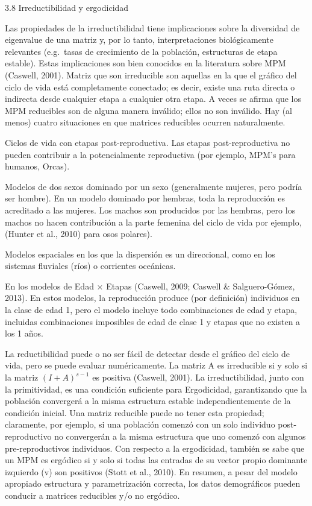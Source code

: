 \documentclass[
  12pt,
  letterpaper,
]{book}
\begin{document}
3.8 \textbar{} Irreductibilidad y ergodicidad

Las propiedades de la irreductibilidad tiene implicaciones sobre la
diversidad de eigenvalue de una matriz y, por lo tanto, interpretaciones
biológicamente relevantes (e.g.~tasas de crecimiento de la población,
estructuras de etapa estable). Estas implicaciones son bien conocidos en
la literatura sobre MPM (Caswell, 2001). Matriz que son irreducible son
aquellas en la que el gráfico del ciclo de vida está completamente
conectado; es decir, existe una ruta directa o indirecta desde cualquier
etapa a cualquier otra etapa. A veces se afirma que los MPM reducibles
son de alguna manera inválido; ellos no son inválido. Hay (al menos)
cuatro situaciones en que matrices reducibles ocurren naturalmente.

Ciclos de vida con etapas post-reproductiva. Las etapas
post-reproductiva no pueden contribuir a la potencialmente reproductiva
(por ejemplo, MPM's para humanos, Orcas).

Modelos de dos sexos dominado por un sexo (generalmente mujeres, pero
podría ser hombre). En un modelo dominado por hembras, toda la
reproducción es acreditado a las mujeres. Los machos son producidos por
las hembras, pero los machos no hacen contribución a la parte femenina
del ciclo de vida por ejemplo, (Hunter et al., 2010) para osos polares).

Modelos espaciales en los que la dispersión es un direccional, como en
los sistemas fluviales (ríos) o corrientes oceánicas.

En los modelos de Edad × Etapas (Caswell, 2009; Caswell \&
Salguero-Gómez, 2013). En estos modelos, la reproducción produce (por
definición) individuos en la clase de edad 1, pero el modelo incluye
todo combinaciones de edad y etapa, incluidas combinaciones imposibles
de edad de clase 1 y etapas que no existen a los 1 años.

La reductibilidad puede o no ser fácil de detectar desde el gráfico del
ciclo de vida, pero se puede evaluar numéricamente. La matriz A es
irreducible si y solo si la matriz \(\left(I+A\right)^{s-1}\) es
positiva (Caswell, 2001). La irreductibilidad, junto con la
primitividad, es una condición suficiente para Ergodicidad, garantizando
que la población convergerá a la misma estructura estable
independientemente de la condición inicial. Una matriz reducible puede
no tener esta propiedad; claramente, por ejemplo, si una población
comenzó con un solo individuo post-reproductivo no convergerán a la
misma estructura que uno comenzó con algunos pre-reproductivos
individuos. Con respecto a la ergodicidad, también se sabe que un MPM es
ergódico si y solo si todas las entradas de su vector propio dominante
izquierdo (v) son positivos (Stott et al., 2010). En resumen, a pesar
del modelo apropiado estructura y parametrización correcta, los datos
demográficos pueden conducir a matrices reducibles y/o no ergódico.
\end{document}
